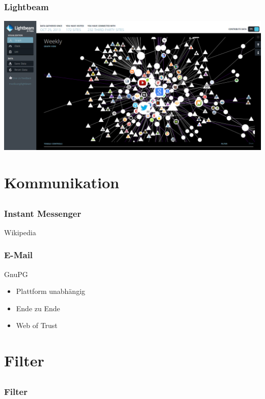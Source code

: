 \documentclass[12pt, table]{beamer}
\begin{document}
\begin{frame}
    \frametitle{Lightbeam}
    \begin{center}
    	\includegraphics[height=0.7\textheight]{../img/lightbeam.png}
    \end{center}
\end{frame}

\section{Kommunikation}
\subsection{}

\begin{frame}
	\frametitle{Instant Messenger}
	Wikipedia
\end{frame}

\begin{frame}
	\frametitle{E-Mail}
	GnuPG
	\begin{itemize}
		\item Plattform unabhängig
		\item Ende zu Ende
		\item Web of Trust
	\end{itemize}
\end{frame}

\section{Filter}
\subsection{}

\begin{frame}
	\frametitle{Filter}
\end{frame}
\end{document}
